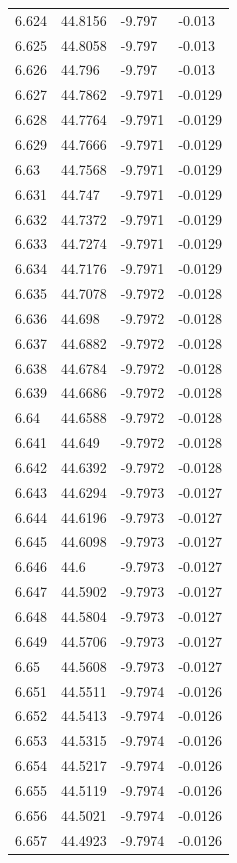 \begin{tabular}{llll}
6.624 & 44.8156 & -9.797 & -0.013 \\
6.625 & 44.8058 & -9.797 & -0.013 \\
6.626 & 44.796 & -9.797 & -0.013 \\
6.627 & 44.7862 & -9.7971 & -0.0129 \\
6.628 & 44.7764 & -9.7971 & -0.0129 \\
6.629 & 44.7666 & -9.7971 & -0.0129 \\
6.63 & 44.7568 & -9.7971 & -0.0129 \\
6.631 & 44.747 & -9.7971 & -0.0129 \\
6.632 & 44.7372 & -9.7971 & -0.0129 \\
6.633 & 44.7274 & -9.7971 & -0.0129 \\
6.634 & 44.7176 & -9.7971 & -0.0129 \\
6.635 & 44.7078 & -9.7972 & -0.0128 \\
6.636 & 44.698 & -9.7972 & -0.0128 \\
6.637 & 44.6882 & -9.7972 & -0.0128 \\
6.638 & 44.6784 & -9.7972 & -0.0128 \\
6.639 & 44.6686 & -9.7972 & -0.0128 \\
6.64 & 44.6588 & -9.7972 & -0.0128 \\
6.641 & 44.649 & -9.7972 & -0.0128 \\
6.642 & 44.6392 & -9.7972 & -0.0128 \\
6.643 & 44.6294 & -9.7973 & -0.0127 \\
6.644 & 44.6196 & -9.7973 & -0.0127 \\
6.645 & 44.6098 & -9.7973 & -0.0127 \\
6.646 & 44.6 & -9.7973 & -0.0127 \\
6.647 & 44.5902 & -9.7973 & -0.0127 \\
6.648 & 44.5804 & -9.7973 & -0.0127 \\
6.649 & 44.5706 & -9.7973 & -0.0127 \\
6.65 & 44.5608 & -9.7973 & -0.0127 \\
6.651 & 44.5511 & -9.7974 & -0.0126 \\
6.652 & 44.5413 & -9.7974 & -0.0126 \\
6.653 & 44.5315 & -9.7974 & -0.0126 \\
6.654 & 44.5217 & -9.7974 & -0.0126 \\
6.655 & 44.5119 & -9.7974 & -0.0126 \\
6.656 & 44.5021 & -9.7974 & -0.0126 \\
6.657 & 44.4923 & -9.7974 & -0.0126 \\

\end{tabular}
